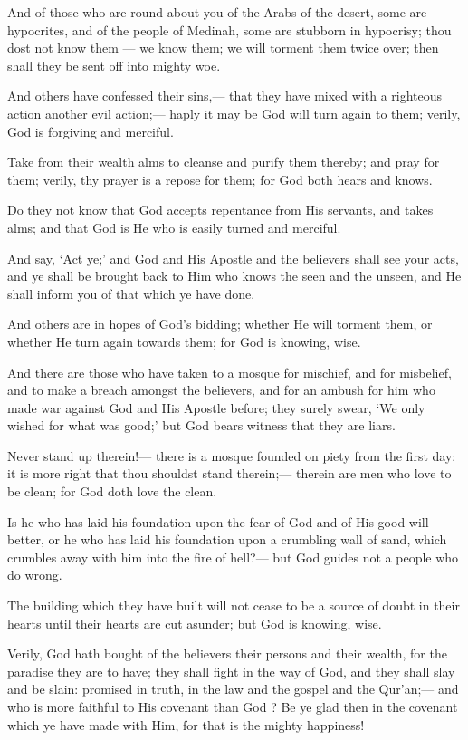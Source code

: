 \documentclass[fontsize=14pt, letterpaper, notitlepage, openany, DIV=12]{scrbook} %
\begin{document}
\noindent[9:101]
And of those who are round about you of the Arabs of the desert, some are hypocrites,
and of the people of Medinah, some are stubborn in hypocrisy; thou dost not know them --- we
know them; we will torment them twice over; then shall they be sent off into mighty woe.

\noindent[9:102]
And others have confessed their sins,--- that they have mixed with a righteous action
another evil action;--- haply it may be God will turn again to them; verily, God is forgiving and
merciful.

\noindent[9:103]
Take from their wealth alms to cleanse and purify them thereby; and pray for them;
verily, thy prayer is a repose for them; for God both hears and knows.

\noindent[9:104]
Do they not know that God accepts repentance from His servants, and takes alms; and
that God is He who is easily turned and merciful.

\noindent[9:105]
And say, `Act ye;' and God and His Apostle and the believers shall see your acts, and ye
shall be brought back to Him who knows the seen and the unseen, and He shall inform you of
that which ye have done.

\noindent[9:106]
And others are in hopes of God's bidding; whether He will torment them, or whether He
turn again towards them; for God is knowing, wise.

\noindent[9:107]
And there are those who have taken to a mosque for mischief, and for misbelief, and to
make a breach amongst the believers, and for an ambush for him who made war against God and
His Apostle before; they surely swear, `We only wished for what was good;' but God bears
witness that they are liars.

\noindent[9:108]
Never stand up therein!--- there is a mosque founded on piety from the first day: it is
more right that thou shouldst stand therein;--- therein are men who love to be clean; for God doth
love the clean.

\noindent[9:109]
Is he who has laid his foundation upon the fear of God and of His good-will better, or he
who has laid his foundation upon a crumbling wall of sand, which crumbles away with him into
the fire of hell?--- but God guides not a people who do wrong.

\noindent[9:110]
The building which they have built will not cease to be a source of doubt in their hearts
until their hearts are cut asunder; but God is knowing, wise.

\noindent[9:111]
Verily, God hath bought of the believers their persons and their wealth, for the paradise
they are to have; they shall fight in the way of God, and they shall slay and be slain: promised in
truth, in the law and the gospel and the Qur'an;--- and who is more faithful to His covenant than
God ? Be ye glad then in the covenant which ye have made with Him, for that is the mighty
happiness!
\end{document}
